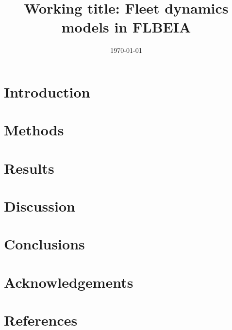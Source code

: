 \documentclass[12pt, halfline, a4paper]{ouparticle}
\begin{document}
\title{Working title: Fleet dynamics models in FLBEIA}

\author{
	\address{GMIT}
	\address{CEFAS}
	\and
	\address{GMIT}
	\and
	\address{AZTI}
}


\date{\today}


\maketitle

\section{Introduction}
\label{intro}

\section{Methods}
\label{meth}

\section{Results}
\label{res}

\section{Discussion}
\label{dis}

\section{Conclusions}
\label{con}


\section{Acknowledgements}
\label{ack}

\section{References}
\label{ref}


\end{document}
